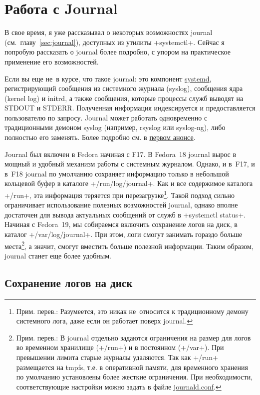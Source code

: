 \documentclass[10pt,oneside,a4paper]{article}
\begin{document}
\section{Работа с Journal}

В свое время, я уже рассказывал о некоторых возможностях journal
(см.~главу~\ref{sec:journal}), доступных из утилиты +systemctl+. Сейчас я
попробую рассказать о journal более подробно, с упором на практическое
применение его возможностей.

Если вы еще не~в курсе, что такое journal: это компонент
\href{http://www.freedesktop.org/wiki/Software/systemd}{systemd}, регистрирующий
сообщения из системного журнала (syslog), сообщения ядра (kernel log) и initrd,
а также сообщения, которые процессы служб выводят на STDOUT и STDERR. Полученная
информация индексируется и предоставляется пользователю по запросу. Journal
может работать одновременно с традиционными демоном syslog (например, rsyslog
или syslog-ng), либо полностью его заменять. Более подробно см. в
\href{http://0pointer.de/blog/projects/the-journal.html}{первом анонсе}.

Journal был включен в Fedora начиная с F17. В Fedora~18 journal вырос в мощный и
удобный механизм работы с системным журналом. Однако, и в~F17, и в~F18 journal
по умолчанию сохраняет информацию только в небольшой кольцевой буфер в каталоге
+/run/log/journal+. Как и все содержимое каталога +/run+, эта информация
теряется при перезагрузке\footnote{Прим. перев.: Разумеется, это никак
не~относится к традиционному демону системного лога, даже если он работает
поверх journal.}. Такой подход сильно ограничивает использование
полезных возможностей journal, однако вполне достаточен для вывода актуальных
сообщений от служб в +systemctl status+. Начиная с Fedora~19, мы собираемся
включить сохранение логов на диск, в каталог +/var/log/journal+. При этом,
логи смогут занимать гораздо больше места\footnote{Прим. перев.: В journal
отдельно задаются ограничения на размер для логов во временном хранилище
(+/run+) и в постоянном (+/var+). При превышении лимита старые журналы
удаляются. Так как +/run+ размещается на tmpfs, т.е. в
оперативной памяти, для временного хранения по умолчанию установлены более
жесткие ограничения. При необходимости, соответствующие настройки можно задать
в файле
\href{http://www.freedesktop.org/software/systemd/man/journald.conf.html}{journald.conf}.},
а значит, смогут вместить больше полезной информации. Таким образом, journal
станет еще более удобным.

\subsection{Сохранение логов на диск}
\end{document}
